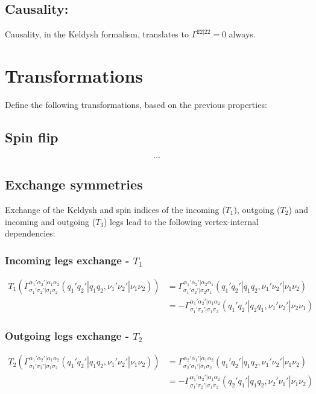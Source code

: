 \documentclass[12pt,a4paper,roman]{article}
\begin{document}
\subsection*{Causality:}
Causality, in the Keldysh formalism, translates to $\Gamma^{22|22} = 0$ always.

\section*{Transformations}
Define the following transformations, based on the previous properties:
\subsection*{Spin flip}
\begin{equation}
    ...
    \label{eq:ts}
\end{equation}

\subsection*{Exchange symmetries}
Exchange of the Keldysh and spin indices of the incoming ($T_1$), outgoing ($T_2$) and incoming and outgoing ($T_3$) legs lead to the following vertex-internal dependencies:
\subsubsection*{Incoming legs exchange - $T_1$}
\begin{align}
    T_1 \left( \Gamma_{\sigma_1'\sigma_2'|\sigma_1\sigma_2}^{\alpha_1'\alpha_2'|\alpha_1\alpha_2}(q_1'q_2'|q_1q_2, \nu_1'\nu_2'|\nu_1\nu_2) \right) &= \Gamma_{\sigma_1'\sigma_2'|\sigma_2\sigma_1}^{\alpha_1'\alpha_2'|\alpha_2\alpha_1}(q_1'q_2'|q_1q_2, \nu_1'\nu_2'|\nu_1\nu_2)\\
    &= -\Gamma_{\sigma_1'\sigma_2'|\sigma_1\sigma_2}^{\alpha_1'\alpha_2'|\alpha_1\alpha_2}(q_1'q_2'|q_2q_1, \nu_1'\nu_2'|\nu_2\nu_1)
    \label{eq:t1}
\end{align}

\subsubsection*{Outgoing legs exchange - $T_2$}
\begin{align}
    T_2 \left( \Gamma_{\sigma_1'\sigma_2'|\sigma_1\sigma_2}^{\alpha_1'\alpha_2'|\alpha_1\alpha_2}(q_1'q_2'|q_1q_2, \nu_1'\nu_2'|\nu_1\nu_2) \right) &= \Gamma_{\sigma_2'\sigma_1'|\sigma_1\sigma_2}^{\alpha_2'\alpha_1'|\alpha_1\alpha_2}(q_1'q_2'|q_1q_2, \nu_1'\nu_2'|\nu_1\nu_2)\\
    &= -\Gamma_{\sigma_1'\sigma_2'|\sigma_1\sigma_2}^{\alpha_1'\alpha_2'|\alpha_1\alpha_2}(q_2'q_1'|q_1q_2, \nu_2'\nu_1'|\nu_1\nu_2)
    \label{eq:t2}
\end{align}
\end{document}
